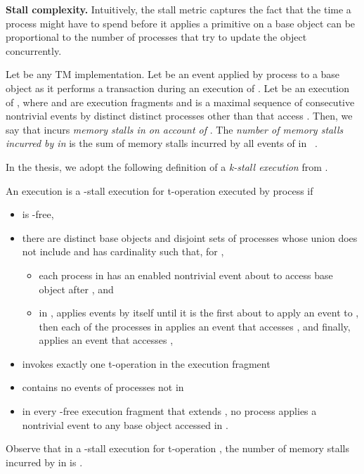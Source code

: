 \vspace{1mm}\noindent\textbf{Stall complexity.}
Intuitively, the stall metric captures the fact that the time a process might have to spend before it applies a 
primitive on a base object can be proportional to the number of processes that try to update the object concurrently.  

Let  be any TM implementation.
Let  be an event applied by process  to a base object  as it performs a transaction  during an execution  of .
Let  be an execution of , where  and  are execution 
fragments and 
is a maximal sequence of  consecutive nontrivial events by distinct distinct processes other than  that access .
Then, we say that  incurs  \emph{memory stalls in  on account of }.
The \emph{number of memory stalls incurred by  in } is the sum of memory stalls incurred by all events of  in ~\cite{G05,AGHK09}.

In the thesis, we adopt the following definition of a \emph{k-stall execution} from \cite{AGHK09,G05}.
\begin{definition}
\label{def:stalls}
An execution  is a -stall execution for t-operation  executed by process  if
\begin{itemize}
\item 
 is -free,
\item
there are distinct base objects  and disjoint sets of processes 
whose union does not include 
and has cardinality  such that, for ,
\begin{itemize}
\item
each process in  has an enabled nontrivial event about to access base object  after , and
\item
in ,  applies events by itself until it is the first about to apply an event to ,
then each of the processes in  applies an event that accesses , and finally,  applies an event that accesses ,
\end{itemize}
\item
 invokes exactly one t-operation  in the execution fragment 
\item
 contains no events of processes not in 
\item
in every -free execution fragment that extends , 
no process applies a nontrivial event to any base object accessed in .
\end{itemize}
\end{definition}
Observe that in a -stall execution  for t-operation , the number of memory stalls incurred by 
in  is .

